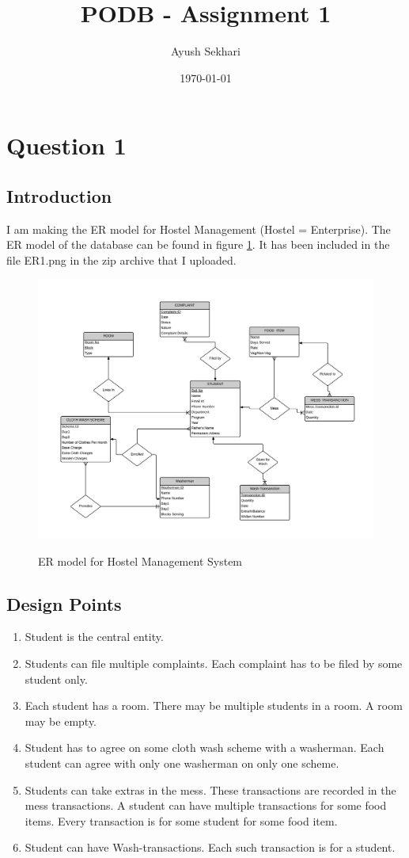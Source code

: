 \documentclass[12pt]{article}%
\begin{document}
\title{PODB - Assignment 1}
\author{Ayush Sekhari}
\date{\today}
\maketitle

\section{Question 1}
\subsection{Introduction}
I am making the ER model for Hostel Management (Hostel = Enterprise).
The ER model of the database can be found in figure \ref{fig:er}. It has been included in the file ER1.png in the zip archive that I uploaded. 

\begin{figure}
\includegraphics[width=\textwidth]{ER1.png}
\label{fig:er}
\caption{ER model for Hostel Management System}
\end{figure}

\subsection{Design Points}
\begin{enumerate}
\item Student is the central entity. 
\item Students can file multiple complaints. Each complaint has to be filed by some student only. 
\item Each student has a room. There may be multiple students in a room. A room may be empty. 
\item Student has to agree on some cloth wash scheme with a washerman. Each student can agree with only one washerman on only one scheme.
\item Students can take extras in the mess. These transactions are recorded in the mess transactions. A student can have multiple transactions for some food items. Every transaction is for some student for some food item. 
\item Student can have Wash-transactions. Each such transaction is for a student. 
\end{enumerate}
\end{document}
